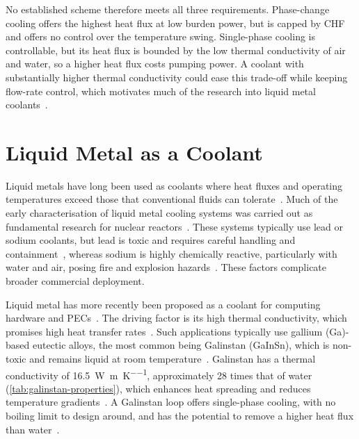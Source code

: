 No established scheme therefore meets all three requirements. Phase-change
cooling offers the highest heat flux at low burden power, but is capped by CHF
and offers no control over the temperature swing. Single-phase
cooling is controllable, but its heat flux is bounded by the low thermal
conductivity of air and water, so a higher heat flux costs pumping power. A
coolant with substantially higher thermal conductivity could ease this trade-off
while keeping flow-rate control, which motivates much of the research into
liquid metal coolants~\cite{hodes_potential_2014}.

\section{Liquid Metal as a Coolant}
\label{sec:liquid-metal}

Liquid metals have long been used as coolants where heat fluxes and operating
temperatures exceed those that conventional fluids can tolerate~\cite{rowinski_small_2015}. 
Much of the early characterisation of liquid metal cooling systems was carried out as fundamental research for nuclear
reactors~\cite{rowinski_small_2015}. These systems typically use lead or sodium
coolants, but lead is toxic and requires careful handling and
containment~\cite{oecd_handbook_2015}, whereas sodium is highly chemically
reactive, particularly with water and air, posing fire and explosion
hazards~\cite{foust_sodium-nak_1972}. These factors complicate broader commercial
deployment.

Liquid metal has more recently been proposed as a coolant for computing hardware and
PECs~\cite{fan_ultra-efficient_2026,zhang_water-based_2015}. The driving factor is its high thermal
conductivity, which promises high heat transfer rates~\cite{hodes_potential_2014,fan_ultra-efficient_2026,zhang_experimental_2019,zhang_investigation_2023}.
Such applications typically use gallium (Ga)-based eutectic alloys, the most
common being Galinstan (GaInSn), which is non-toxic and remains liquid at room temperature~\cite{hodes_potential_2014,an_liquid_2024}. 
Galinstan has a thermal conductivity of \SI{16.5}{\watt\per\metre\per\kelvin},
approximately 28 times that of water (\cref{tab:galinstan-properties}), which
enhances heat spreading and reduces temperature gradients~\cite{hodes_potential_2014,zhang_experimental_2019}. 
A Galinstan loop offers single-phase cooling, with no boiling limit to design around, and has the potential to
remove a higher heat flux than water~\cite{hodes_potential_2014, zhang_experimental_2019}.

